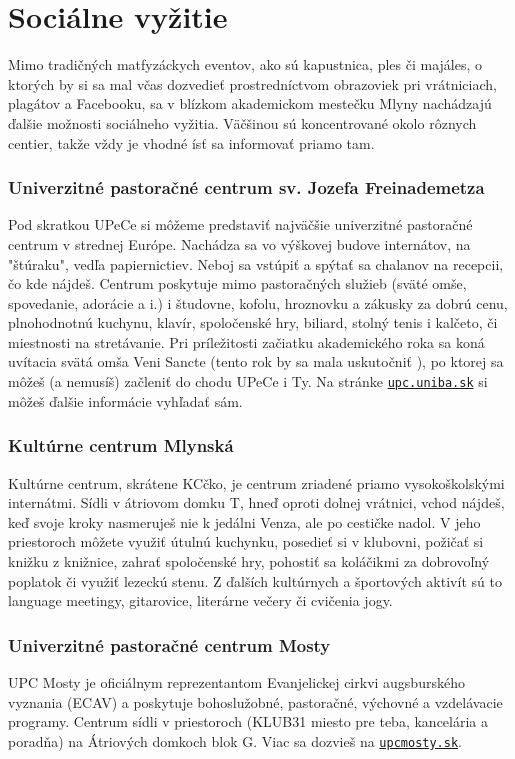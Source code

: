 \newpage
\chapter{Sociálne vyžitie}
Mimo tradičných matfyzáckych eventov, ako sú kapustnica, ples či majáles, o ktorých by si sa mal včas dozvedieť prostredníctvom obrazoviek pri vrátniciach, plagátov a Facebooku, sa v blízkom akademickom mestečku Mlyny nachádzajú ďalšie možnosti sociálneho vyžitia. Väčšinou sú koncentrované okolo rôznych centier, takže vždy je vhodné ísť sa informovať priamo tam.

\subsection*{Univerzitné pastoračné centrum sv. Jozefa Freinademetza}

Pod skratkou UPeCe si môžeme predstaviť najväčšie univerzitné pastoračné centrum v strednej Európe. Nachádza sa vo výškovej budove internátov, na "štúraku", vedľa papiernictiev. Neboj sa vstúpiť a spýtať sa chalanov na recepcii, čo kde nájdeš. Centrum poskytuje mimo pastoračných služieb (sväté omše, spovedanie, adorácie a i.) i študovne, kofolu, hroznovku a zákusky za dobrú cenu, plnohodnotnú kuchynu, klavír, spoločenské hry, biliard, stolný tenis i kalčeto, či miestnosti na stretávanie. Pri príležitosti začiatku akademického roka sa koná uvítacia svätá omša Veni Sancte (tento rok by sa mala uskutočniť {\veniSanctedd} \veniSancte), po ktorej sa môžeš (a nemusíš) začleniť do chodu UPeCe i Ty.
Na stránke \href{https://upc.uniba.sk}{\texttt{upc.uniba.sk}} si môžeš ďalšie informácie vyhľadať sám.


\subsection*{Kultúrne centrum Mlynská}
Kultúrne centrum, skrátene KCčko, je centrum zriadené priamo vysokoškolskými internátmi. Sídli v átriovom domku T, hneď oproti dolnej vrátnici, vchod nájdeš, keď svoje kroky nasmeruješ nie k jedálni Venza, ale po cestičke nadol. V jeho priestoroch môžete využiť útulnú kuchynku, posedieť si v klubovni, požičať si knižku z knižnice, zahrať spoločenské hry, pohostiť sa koláčikmi za dobrovoľný poplatok či využiť lezeckú stenu. Z ďalších kultúrnych a športových aktivít sú to language meetingy, gitarovice, literárne večery či cvičenia jogy.
 

\subsection*{Univerzitné pastoračné centrum Mosty}
UPC Mosty je oficiálnym reprezentantom Evanjelickej cirkvi augsburského vyznania (ECAV) a poskytuje bohoslužobné, pastoračné, výchovné a vzdelávacie programy. Centrum sídli v priestoroch (KLUB31 miesto pre teba, kancelária a poradňa) na Átriových domkoch blok G.
Viac sa dozvieš na \href{http://upcmosty.sk}{\texttt{upcmosty.sk}}.

